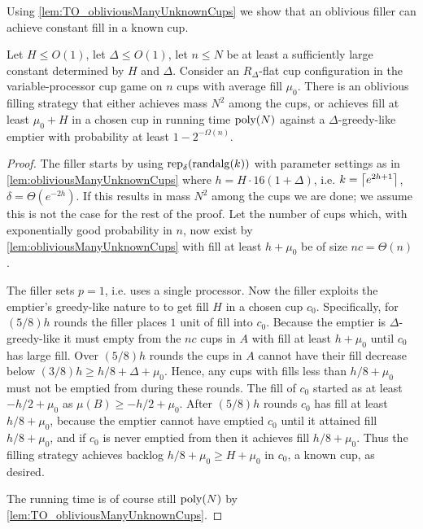 Using \cref{lem:TO_obliviousManyUnknownCups} we show that an
oblivious filler can achieve constant fill in a known cup.
\begin{proposition}
  \label{prop:TO_obliviousBase}
  Let $H \le O(1)$, let $\Delta \le O(1)$, let $n\le N$ be at least a
  sufficiently large constant determined by $H$ and $\Delta$. 
  Consider an $R_\Delta$-flat cup configuration in the variable-processor cup
  game on $n$ cups with average fill $\mu_0$.
  There is an oblivious filling strategy that either
  achieves mass $N^2$ among the cups, or achieves fill at least $\mu_0 + H$
  in a chosen cup in running time $\operatorname{\text{poly}}(N)$ against a
  $\Delta$-greedy-like emptier with probability at least $1-2^{-\Omega(n)}.$
\end{proposition}
\begin{proof}
  The filler starts by using $\operatorname{\text{\textup{rep}}}_\delta(\operatorname{\text{\textup{randalg}}}(k))$ with
  parameter settings as in \cref{lem:obliviousManyUnknownCups}
  where $h = H\cdot 16(1+\Delta)$, i.e. $k = \left\lceil e^{2h+1} \right\rceil$,
  $\delta = \Theta(e^{-2h})$. 
  If this results in mass $N^2$ among the cups we are done; we
  assume this is not the case for the rest of the proof.
  Let the number of cups which, with exponentially good
  probability in $n$, now exist by
  \cref{lem:obliviousManyUnknownCups} with
  fill at least $h+\mu_0$ be of size $nc = \Theta(n)$.

  The filler sets $p=1$, i.e. uses a single processor. Now the
  filler exploits the emptier's greedy-like nature to to get fill
  $H$ in a chosen cup $c_0$. Specifically, for $(5/8)h$ rounds
  the filler places $1$ unit of fill into $c_0$. Because the
  emptier is $\Delta$-greedy-like it must empty from the $nc$
  cups in $A$ with fill at least $h+\mu_0$ until $c_0$ has large
  fill. Over $(5/8)h$ rounds the cups in $A$ cannot have their
  fill decrease below $(3/8)h \ge h/8 + \Delta + \mu_0$. Hence,
  any cups with fills less than $h/8+\mu_0$ must not be emptied
  from during these rounds. The fill of $c_0$ started as at least
  $-h/2+\mu_0$ as $\mu(B) \ge -h/2+\mu_0$. After $(5/8)h$ rounds
  $c_0$ has fill at least $h/8+\mu_0$, because the emptier cannot
  have emptied $c_0$ until it attained fill $h/8+\mu_0$, and if
  $c_0$ is never emptied from then it achieves fill $h/8+\mu_0$.
  Thus the filling strategy achieves backlog $h/8 +\mu_0 \ge H +
  \mu_0$ in $c_0$, a known cup, as desired.

  The running time is of course still $\operatorname{\text{poly}}(N)$ by
  \cref{lem:TO_obliviousManyUnknownCups}.
\end{proof}

